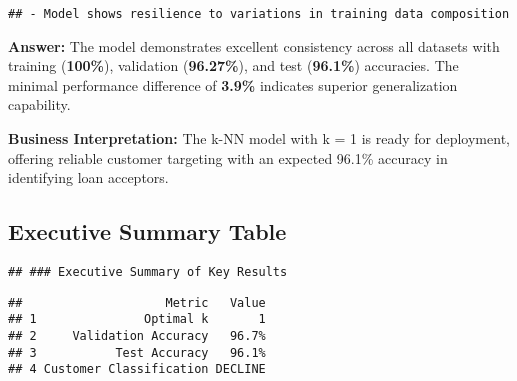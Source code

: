 \documentclass[
]{article}
\begin{document}
\begin{verbatim}
## - Model shows resilience to variations in training data composition
\end{verbatim}

\textbf{Answer:} The model demonstrates excellent consistency across all
datasets with training (\textbf{100\%}), validation (\textbf{96.27\%}),
and test (\textbf{96.1\%}) accuracies. The minimal performance
difference of \textbf{3.9\%} indicates superior generalization
capability.

\textbf{Business Interpretation:} The k-NN model with k = 1 is ready for
deployment, offering reliable customer targeting with an expected 96.1\%
accuracy in identifying loan acceptors.

\subsection{Executive Summary Table}\label{executive-summary-table}

\begin{verbatim}
## ### Executive Summary of Key Results
\end{verbatim}

\begin{verbatim}
##                    Metric   Value
## 1               Optimal k       1
## 2     Validation Accuracy   96.7%
## 3           Test Accuracy   96.1%
## 4 Customer Classification DECLINE
\end{verbatim}
\end{document}
